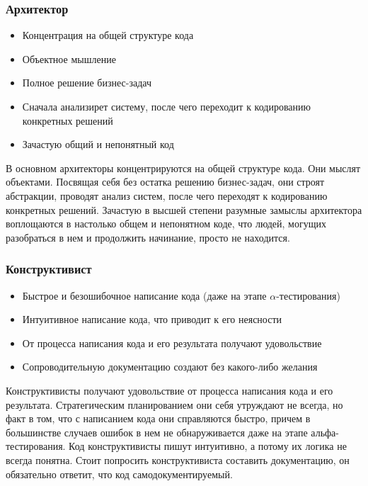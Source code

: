 \documentclass{../industrial-development}
\begin{document}
{\begin{frame} \frametitle{Архитектор}
	 \begin{itemize}
                     \item Концентрация на общей структуре кода
 		\item Объектное мышление
		\item Полное решение бизнес-задач
 		\item Сначала анализирет систему, после чего переходит к кодированию конкретных решений
		\item Зачастую общий и непонятный код
		\end{itemize} 
\end{frame}
\lecturenotes
В основном архитекторы концентрируются на общей структуре кода. Они мыслят объектами. Посвящая себя без остатка решению бизнес-задач, они строят абстракции, проводят анализ систем, после чего переходят к кодированию конкретных решений.
Зачастую в высшей степени разумные замыслы архитектора воплощаются в настолько общем и непонятном коде, что людей, могущих разобраться в нем и продолжить начинание, просто не находится.

\begin{frame} \frametitle{Конструктивист}
	 \begin{itemize}
                     \item Быстрое и безошибочное написание кода (даже на этапе $\alpha$-тестирования)
 		\item Интуитивное написание кода, что приводит к его неясности
		\item От процесса написания кода и его результата получают удовольствие
 		\item Сопроводительную документацию создают без какого-либо желания
		\end{itemize}
\end{frame}
\lecturenotes
Конструктивисты получают удовольствие от процесса написания кода и его результата. Стратегическим планированием они себя утруждают не всегда, но факт в том, что с написанием кода они справляются быстро, причем в большинстве случаев ошибок в нем не обнаруживается даже на этапе альфа-тестирования. Код конструктивисты пишут интуитивно, а потому их логика не всегда понятна.
Стоит попросить конструктивиста составить документацию, он обязательно ответит, что код самодокументируемый.

}
\end{document}
